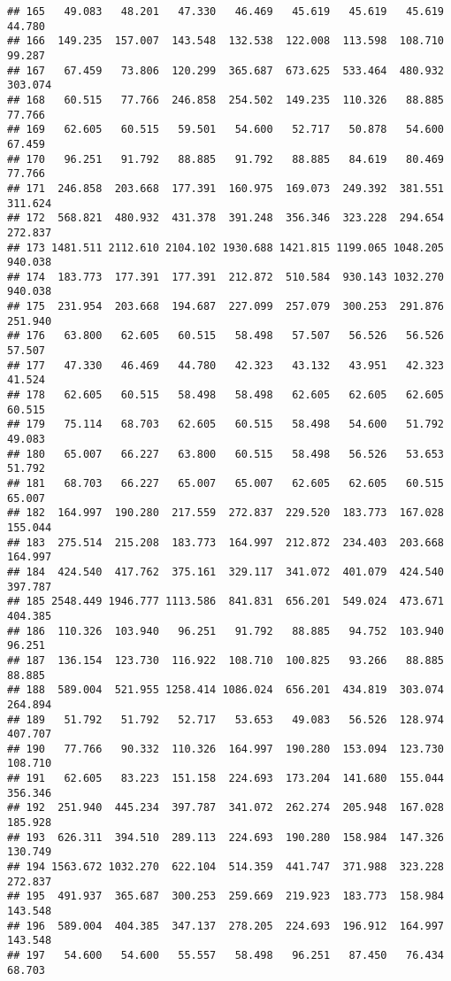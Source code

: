 \documentclass[
]{article}
\begin{document}
\begin{verbatim}
## 165   49.083   48.201   47.330   46.469   45.619   45.619   45.619   44.780
## 166  149.235  157.007  143.548  132.538  122.008  113.598  108.710   99.287
## 167   67.459   73.806  120.299  365.687  673.625  533.464  480.932  303.074
## 168   60.515   77.766  246.858  254.502  149.235  110.326   88.885   77.766
## 169   62.605   60.515   59.501   54.600   52.717   50.878   54.600   67.459
## 170   96.251   91.792   88.885   91.792   88.885   84.619   80.469   77.766
## 171  246.858  203.668  177.391  160.975  169.073  249.392  381.551  311.624
## 172  568.821  480.932  431.378  391.248  356.346  323.228  294.654  272.837
## 173 1481.511 2112.610 2104.102 1930.688 1421.815 1199.065 1048.205  940.038
## 174  183.773  177.391  177.391  212.872  510.584  930.143 1032.270  940.038
## 175  231.954  203.668  194.687  227.099  257.079  300.253  291.876  251.940
## 176   63.800   62.605   60.515   58.498   57.507   56.526   56.526   57.507
## 177   47.330   46.469   44.780   42.323   43.132   43.951   42.323   41.524
## 178   62.605   60.515   58.498   58.498   62.605   62.605   62.605   60.515
## 179   75.114   68.703   62.605   60.515   58.498   54.600   51.792   49.083
## 180   65.007   66.227   63.800   60.515   58.498   56.526   53.653   51.792
## 181   68.703   66.227   65.007   65.007   62.605   62.605   60.515   65.007
## 182  164.997  190.280  217.559  272.837  229.520  183.773  167.028  155.044
## 183  275.514  215.208  183.773  164.997  212.872  234.403  203.668  164.997
## 184  424.540  417.762  375.161  329.117  341.072  401.079  424.540  397.787
## 185 2548.449 1946.777 1113.586  841.831  656.201  549.024  473.671  404.385
## 186  110.326  103.940   96.251   91.792   88.885   94.752  103.940   96.251
## 187  136.154  123.730  116.922  108.710  100.825   93.266   88.885   88.885
## 188  589.004  521.955 1258.414 1086.024  656.201  434.819  303.074  264.894
## 189   51.792   51.792   52.717   53.653   49.083   56.526  128.974  407.707
## 190   77.766   90.332  110.326  164.997  190.280  153.094  123.730  108.710
## 191   62.605   83.223  151.158  224.693  173.204  141.680  155.044  356.346
## 192  251.940  445.234  397.787  341.072  262.274  205.948  167.028  185.928
## 193  626.311  394.510  289.113  224.693  190.280  158.984  147.326  130.749
## 194 1563.672 1032.270  622.104  514.359  441.747  371.988  323.228  272.837
## 195  491.937  365.687  300.253  259.669  219.923  183.773  158.984  143.548
## 196  589.004  404.385  347.137  278.205  224.693  196.912  164.997  143.548
## 197   54.600   54.600   55.557   58.498   96.251   87.450   76.434   68.703

\end{verbatim}
\end{document}
